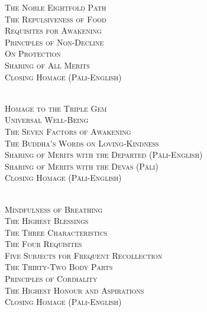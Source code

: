 {  \textsc{
    The Noble Eightfold Path \pageref{noble-eightfold-path}\\
    The Repulsiveness of Food \pageref{repulsiveness-of-food}\\
    Requisites for Awakening \pageref{requisites-for-awakening}\\
    Principles of Non-Decline \pageref{principles-of-non-decline}\\
    On Protection \pageref{protection}\\
    Sharing of All Merits \pageref{sharing-all-merits}\\
    Closing Homage (Pāli-English) \pageref{closing-homage}}\\

  {\libertinusFont\selectfont\textbf{\textsc{}}}\\

  \textsc{
    Homage to the Triple Gem \pageref{dedication-of-offerings}\\
    Universal Well-Being \pageref{universal-well-being}\\
    The Seven Factors of Awakening \pageref{seven-factors-of-awakening}\\
    The Buddha's Words on Loving-Kindness \pageref{words-on-loving-kindness}\\
    Sharing of Merits with the Departed (Pāli-English) \pageref{sharing-merits-departed}\\
    Sharing of Merits with the Devas (Pāli) \pageref{sharing-merits-devas}\\
    Closing Homage (Pāli-English) \pageref{closing-homage}}\\


  {\libertinusFont\selectfont\textbf{\textsc{}}}\\

  \textsc{
    Mindfulness of Breathing \pageref{mindfulness-of-breathing}\\
    The Highest Blessings \pageref{highest-blessings}\\
    The Three Characteristics \pageref{three-characteristics}\\
    The Four Requisites \pageref{four-requisites}\\
    Five Subjects for Frequent Recollection \pageref{five-recollections}\\
    The Thirty-Two Body Parts \pageref{32-parts}\\
    Principles of Cordiality \pageref{principles-of-cordiality}\\
    The Highest Honour and Aspirations \pageref{highest-honour-aspirations}\\
    Closing Homage (Pāli-English) \pageref{closing-homage}}\\

}
